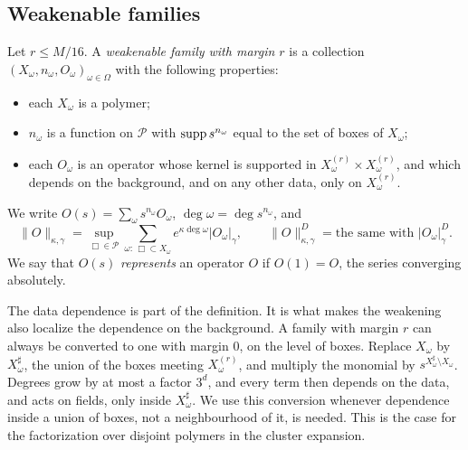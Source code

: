 \subsection{Weakenable families}

\begin{definition}\label{def:weak-family}
Let $r\le M/16$. A \emph{weakenable family with margin $r$} is a collection $(X_\omega,n_\omega,O_\omega)_{\omega\in\Omega}$ with the following properties:
\begin{itemize}
\item each $X_\omega$ is a polymer;
\item $n_\omega$ is a function on $\mathcal P$ with $\operatorname{supp} s^{n_\omega}$ equal to the set of boxes of $X_\omega$;
\item each $O_\omega$ is an operator whose kernel is supported in $X_\omega^{(r)}\times X_\omega^{(r)}$, and which depends on the background, and on any other data, only on $X_\omega^{(r)}$.
\end{itemize}
We write $O(s)=\sum_\omega s^{n_\omega}O_\omega$, $\deg\omega=\deg s^{n_\omega}$, and
\[
\|O\|_{\kappa,\gamma}=\sup_{\Box\in\mathcal P}\sum_{\omega:\,\Box\subset X_\omega}e^{\kappa\deg\omega}|O_\omega|_\gamma ,\qquad\|O\|^D_{\kappa,\gamma}=\text{the same with }|O_\omega|^D_\gamma .
\]
We say that $O(s)$ \emph{represents} an operator $O$ if $O(1)=O$, the series converging absolutely.
\end{definition}

The data dependence is part of the definition. It is what makes the weakening also localize the dependence on the background. A family with margin $r$ can always be converted to one with margin $0$, on the level of boxes. Replace $X_\omega$ by $X^\sharp_\omega$, the union of the boxes meeting $X_\omega^{(r)}$, and multiply the monomial by $s^{X^\sharp_\omega\setminus X_\omega}$. Degrees grow by at most a factor $3^d$, and every term then depends on the data, and acts on fields, only inside $X^\sharp_\omega$. We use this conversion whenever dependence inside a union of boxes, not a neighbourhood of it, is needed. This is the case for the factorization over disjoint polymers in the cluster expansion.

